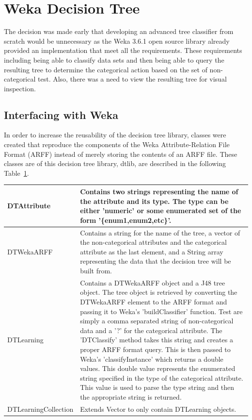 \section{Weka Decision Tree}
The decision was made early that developing an advanced tree classifier from scratch would
be unnecessary as the Weka 3.6.1\cite{weka} open source library already provided an implementation that meet
all the requirements.  These requirements including being able to classify data sets and 
then being able to query the resulting tree to determine the categorical action based on the set
of non-categorical test.  Also, there was a need to view the resulting tree for visual inspection.

\subsection{Interfacing with Weka}
In order to increase the reusability of the decision tree library, classes were created that 
reproduce the components of the Weka Attribute-Relation File Format (ARFF) instead of merely
storing the contents of an ARFF file.  These classes are of this decision tree library, dtlib, 
are described in the following Table~\ref{table:attribs}.

\begin{table}[h]
\label{table:attribs}
\centering
\begin{tabular}{|l|p{5in}|}
\hline
DTAttribute &
Contains two strings representing the name of the attribute and its type.
The type can be either 'numeric' or some enumerated set of the form '\{enum1,enum2,etc\}'.\\
\hline
DTWekaARFF &
Contains a string for the name of the tree, a vector of the non-categorical attributes and the 
categorical attribute as the last element, and a String array representing the data that the 
decision tree will be built from.\\
\hline
DTLearning &
Contains a DTWekaARFF object and a J48 tree object.  The tree object is retrieved by converting
the DTWekaARFF element to the ARFF format and passing it to Weka's 'buildClassifier' function.  
Test are simply a comma separated string of non-categorical data and a '?' for the categorical 
attribute.  The 'DTClassify' method takes this string and creates a proper ARFF format query.
This is then passed to Weka's 'classifyInstance' which returns a double values.  This double value
represents the enumerated string specified in the type of the categorical attribute.  This value is
used to parse the type string and then the appropriate string is returned.  \\
\hline
DTLearningCollection &
Extends Vector to only contain DTLearning objects.\\
\hline
\end{tabular}
\end{table}

